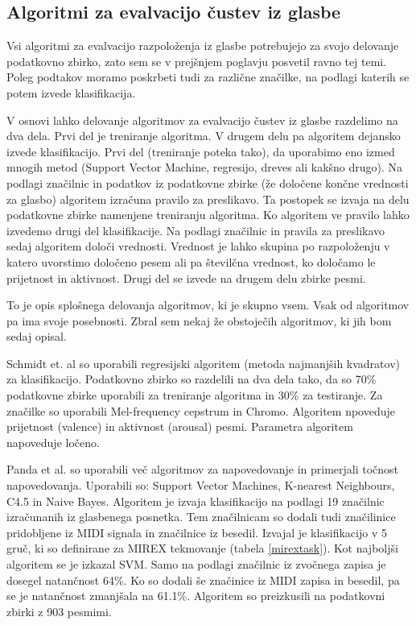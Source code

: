 \documentclass[a4paper, 12pt]{book}
\begin{document}
{\subsection{Algoritmi za evalvacijo čustev iz glasbe} 

Vsi algoritmi za evalvacijo razpoloženja iz glasbe potrebujejo za svojo delovanje podatkovno zbirko, zato sem se v prejšnjem poglavju posvetil ravno tej temi. Poleg podtakov moramo poskrbeti tudi za različne značilke, na podlagi katerih se potem izvede klasifikacija. 

V osnovi lahko delovanje algoritmov za evalvacijo čustev iz glasbe razdelimo na dva dela. Prvi del je treniranje algoritma. V drugem delu pa algoritem dejansko izvede klasifikacijo. Prvi del (treniranje poteka tako), da uporabimo eno izmed mnogih metod (Support Vector Machine, regresijo, dreves ali kakšno drugo). Na podlagi značilnic in podatkov iz podatkovne zbirke (že določene končne vrednosti za glasbo) algoritem izračuna pravilo za preslikavo. Ta postopek se izvaja na delu podatkovne zbirke namenjene treniranju algoritma. Ko algoritem ve pravilo lahko izvedemo drugi del klasifikacije. Na podlagi značilnic in pravila za preslikavo sedaj algoritem določi vrednosti. Vrednost je lahko skupina po razpoloženju v katero uvorstimo določeno pesem ali pa številčna vrednost, ko določamo le prijetnost in aktivnost. Drugi del se izvede na drugem delu zbirke pesmi. 

To je opis splošnega delovanja algoritmov, ki je skupno vsem. Vsak od algoritmov pa ima svoje posebnosti. Zbral sem nekaj že obstoječih algoritmov, ki jih bom sedaj opisal.

Schmidt et. al \cite{schmidt2009projection} so uporabili regresijski algoritem (metoda najmanjših kvadratov) za klasifikacijo. Podatkovno zbirko so razdelili na dva dela tako, da so 70\% podatkovne zbirke uporabili za treniranje algoritma in 30\% za testiranje. Za značilke so uporabili Mel-frequency cepstrum in Chromo. Algoritem npoveduje prijetnost (valence) in aktivnost (arousal) pesmi. Parametra algoritem napoveduje ločeno. 

Panda et al. \cite{panda2013multi} so uporabili več algoritmov za napovedovanje in primerjali točnost napovedovanja. Uporabili so: Support Vector Machines, K-nearest Neighbours, C4.5 in Naive Bayes. Algoritem je izvaja klasifikacijo na podlagi 19 značilnic izračunanih iz glasbenega posnetka. Tem značilnicam so dodali tudi značilinice pridobljene iz MIDI signala in značilnice iz besedil. Izvajal je klasifikacijo v 5 gruč, ki so definirane za MIREX tekmovanje (tabela \ref{mirextask}).  Kot najboljši algoritem se je izkazal SVM. Samo na podlagi značilnic iz zvočnega zapisa je dosegel natančnost 64\%. Ko so dodali še značinice iz MIDI zapisa in besedil, pa se je natančnost zmanjšala na 61.1\%. Algoritem so preizkusili na podatkovni zbirki z 903 pesmimi. 

}
\end{document}
